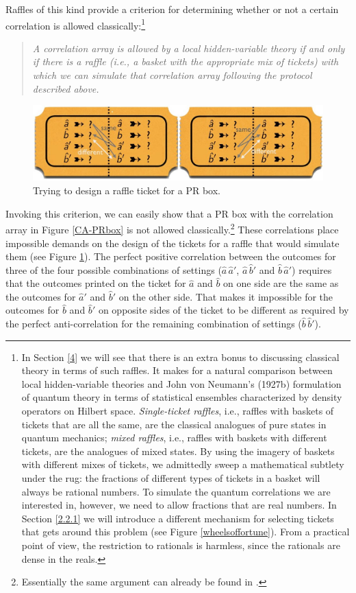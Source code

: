 Raffles of this kind provide a criterion for determining whether or not a certain correlation is allowed classically:\footnote{In Section \ref{4} we will see that there is an extra bonus to discussing classical theory in terms of such raffles. It makes for a natural comparison between local hidden-variable theories and John von Neumann's (1927b) formulation of quantum theory in terms of statistical ensembles characterized by density operators on Hilbert space. \emph{Single-ticket raffles}, i.e., raffles with baskets of tickets that are all the same, are the classical analogues of pure states in quantum mechanics; \emph{mixed raffles}, i.e., raffles with baskets with different tickets, are the analogues of mixed states. By using the imagery of baskets with different mixes of tickets, we admittedly sweep a mathematical subtlety under the rug: the fractions of different types of tickets in a basket will always be rational numbers. To simulate the quantum correlations we are interested in, however, we need to allow fractions that are real numbers. In Section \ref{2.2.1} we will introduce a different mechanism for selecting tickets that gets around this problem (see Figure \ref{wheelsoffortune}). From a practical point of view, the restriction to rationals is harmless, since the rationals are dense in the reals.\label{dense}}
\begin{quote}
\emph{A correlation array is allowed by a local hidden-variable theory if and only if there is a raffle (i.e., a basket with the appropriate mix of tickets) with which we can simulate that correlation array following the protocol described above.}
\end{quote}

\begin{figure}[ht]
 \centering
   \includegraphics[width=4.5in]{raffle-ticket-PRbox.jpeg} 
   \caption{Trying to design a raffle ticket for a PR box.}
   \label{raffle-ticket-PRbox}
\end{figure}

Invoking this criterion, we can easily show that a PR box with the correlation array in Figure \ref{CA-PRbox} is not allowed classically.\footnote{Essentially the same argument can already be found in \citet[p.\ 970]{Rastall 1995}.} These correlations place impossible demands on the design of the tickets for a raffle that would simulate them (see Figure \ref{raffle-ticket-PRbox}). The perfect positive correlation between the outcomes for three of the four possible combinations of settings ($\hat{a} \, \hat{a}'$, $\hat{a} \, \hat{b}'$ and $\hat{b} \, \hat{a}'$) requires that the outcomes printed on the ticket for $\hat{a}$ and $\hat{b}$ on one side are the same as the outcomes for $\hat{a}'$ and $\hat{b}'$ on the other side. That makes it impossible for the outcomes for $\hat{b}$ and $\hat{b}'$ on opposite sides of the ticket to be different as required by the perfect anti-correlation for the remaining combination of settings ($\hat{b} \, \hat{b}'$). 

